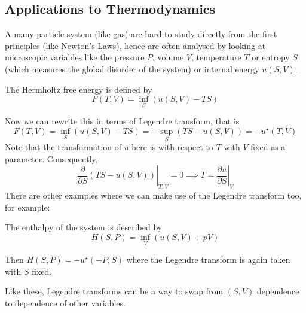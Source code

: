 \documentclass{article}
\begin{document}
\subsection{Applications to Thermodynamics}
A many-particle system (like gas) are hard to study directly from the first principles (like Newton's Laws), hence are often analysed by looking at microscopic variables like the pressure $P$, volume $V$, temperature $T$ or entropy $S$ (which measures the global disorder of the system) or internal energy $u(S,V)$.
\begin{definition}
    The Hermholtz free energy is defined by
    $$F(T,V)=\inf_{S}(u(S,V)-TS)$$
\end{definition}
Now we can rewrite this in terms of Legendre transform, that is
$$F(T,V)=\inf_{S}(u(S,V)-TS)=-\sup_{S}(TS-u(S,V))=-u^\star(T,V)$$
Note that the transformation of $u$ here is with respect to $T$ with $V$ fixed as a parameter.
Consequently,
$$\left.\frac{\partial}{\partial S}(TS-u(S,V))\right|_{T,V}=0\implies T=\left.\frac{\partial u}{\partial S}\right|_V$$
There are other examples where we can make use of the Legendre transform too, for example:
\begin{definition}
    The enthalpy of the system is described by
    $$H(S,P)=\inf_{V}(u(S,V)+pV)$$
\end{definition}
Then $H(S,P)=-u^\star(-P,S)$ where the Legendre transform is again taken with $S$ fixed.

Like these, Legendre transforms can be a way to swap from $(S,V)$ dependence to dependence of other variables.
\end{document}
